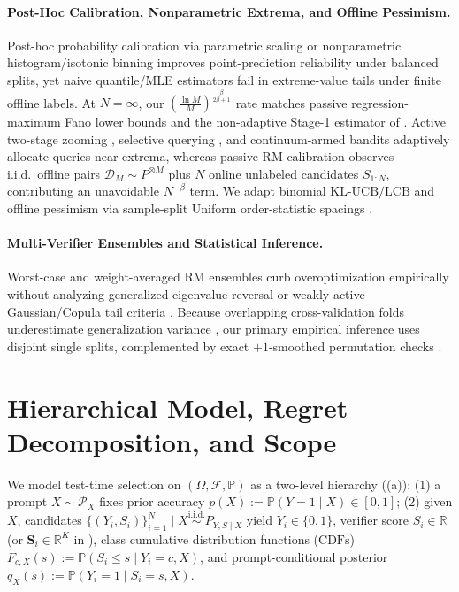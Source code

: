\documentclass[10pt]{article}
\theoremstyle{plain}
\theoremstyle{definition}
\theoremstyle{remark}
\newcommand{\R}{\mathbb{R}}
\newcommand{\Prob}{\mathbb{P}}
\begin{document}
\paragraph{Post-Hoc Calibration, Nonparametric Extrema, and Offline Pessimism.}
Post-hoc probability calibration via parametric scaling \citep{platt1999probabilistic,guo2017calibration} or nonparametric histogram/isotonic binning \citep{zadrozny2002transforming} improves point-prediction reliability under balanced splits, yet naive quantile/MLE estimators fail in extreme-value tails under finite offline labels. At $N = \infty$, our $(\frac{\ln M}{M})^{\frac{\beta}{2\beta+1}}$ rate matches passive regression-maximum Fano lower bounds \citep{muller1985kernel,romano1988weak,tsybakov2009introduction} and the non-adaptive Stage-1 estimator of \citet{belitser2012optimal}. Active two-stage zooming \citep{belitser2012optimal}, selective querying \citep{minsker2013estimation}, and continuum-armed bandits \citep{bubeck2011xarmed} adaptively allocate queries near extrema, whereas passive RM calibration observes i.i.d.\ offline pairs $\mathcal{D}_M \sim P^{\otimes M}$ plus $N$ online unlabeled candidates $S_{1:N}$, contributing an unavoidable $N^{-\beta}$ term. We adapt binomial $\mathrm{KL\text{-}UCB/LCB}$ \citep{garivier2011kl} and offline pessimism \citep{jin2021pessimism} via sample-split Uniform order-statistic spacings \citep{pyke1965spacings}.

\paragraph{Multi-Verifier Ensembles and Statistical Inference.}
Worst-case and weight-averaged RM ensembles curb overoptimization empirically \citep{coste2024reward,rame2024warm} without analyzing generalized-eigenvalue reversal or weakly active Gaussian/Copula tail criteria \citep{savage1962mills,hashorva2003multivariate,tankov2016tails,das2024heavy}. Because overlapping cross-validation folds underestimate generalization variance \citep{nadeau2003inference}, our primary empirical inference uses disjoint single splits, complemented by exact $+1$-smoothed permutation checks \citep{phipson2010permutation}.

\section{Hierarchical Model, Regret Decomposition, and Scope}
\label{sec:model}

We model test-time selection on $(\Omega, \mathcal{F}, \Prob)$ as a two-level hierarchy ((a)): (1) a prompt $X \sim \mathcal{P}_X$ fixes prior accuracy $p(X) := \Prob(Y = 1 \mid X) \in [0, 1]$; (2) given $X$, candidates $\{(Y_i, S_i)\}_{i=1}^N \mid X \stackrel{\mathrm{i.i.d.}}{\sim} P_{Y, S \mid X}$ yield $Y_i \in \{0, 1\}$, verifier score $S_i \in \R$ (or $\mathbf{S}_i \in \R^K$ in ), class cumulative distribution functions ($\mathrm{CDFs}$) $F_{c, X}(s) := \Prob(S_i \le s \mid Y_i = c, X)$, and prompt-conditional posterior $q_X(s) := \Prob(Y_i = 1 \mid S_i = s, X)$.
\end{document}
